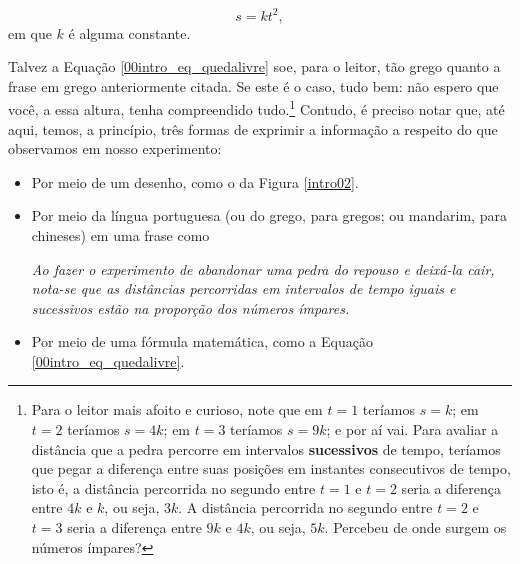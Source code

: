 \begin{equation}
    s = kt^2,
    \label{00intro_eq_quedalivre}
\end{equation}
em que $k$ é alguma constante.

Talvez a Equação \eqref{00intro_eq_quedalivre} soe, para o leitor, tão grego quanto a frase em grego anteriormente citada. Se este é o caso, tudo bem: não espero que você, a essa altura, tenha compreendido tudo.\footnote{Para o leitor mais afoito e curioso, note que em $t=1$ teríamos $s=k$; em $t=2$ teríamos $s=4k$; em $t=3$ teríamos $s=9k$; e por aí vai. Para avaliar a distância que a pedra percorre em intervalos \textbf{sucessivos} de tempo, teríamos que pegar a diferença entre suas posições em instantes consecutivos de tempo, isto é, a distância percorrida no segundo entre $t=1$ e $t=2$ seria a diferença entre $4k$ e $k$, ou seja, $3k$. A distância percorrida no segundo entre $t=2$ e $t=3$ seria a diferença entre $9k$ e $4k$, ou seja, $5k.$ Percebeu de onde surgem os números ímpares?} Contudo, é preciso notar que, até aqui, temos, a princípio, três formas de exprimir a informação a respeito do que observamos em nosso experimento:

\begin{itemize}
    \item [(i)] Por meio de um desenho, como o da Figura \ref{intro02}.

    \item [(ii)] Por meio da língua portuguesa (ou do grego, para gregos; ou mandarim, para chineses) em uma frase como

\begin{center}
    \textit{Ao fazer o experimento de abandonar uma pedra do repouso e deixá-la cair, nota-se que as distâncias percorridas em intervalos de tempo iguais e sucessivos estão na proporção dos números ímpares.}
\end{center}

  \item [(iii)] Por meio de uma fórmula matemática, como a Equação \eqref{00intro_eq_quedalivre}.
    
\end{itemize}



